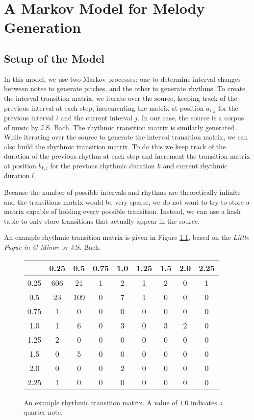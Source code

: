 \chapter{A Markov Model for Melody Generation} \label{markov}

\section{Setup of the Model} \label{markov:setup}

In this model, we use two Markov processes: one to determine interval changes between notes to generate pitches, and the other to generate rhythms.
To create the interval transition matrix, we iterate over the source, keeping track of the previous interval at each step, incrementing the matrix at position $a_{i,j}$ for the previous interval $i$ and the current interval $j$.
In our case, the source is a corpus of music by J.S. Bach.
The rhythmic transition matrix is similarly generated.
While iterating over the source to generate the interval transition matrix, we can also build the rhythmic transition matrix.
To do this we keep track of the duration of the previous rhythm at each step and increment the transition matrix at position $b_{k,l}$ for the previous rhythmic duration $k$ and current rhythmic duration $l$.

Because the number of possible intervals and rhythms are theoretically infinite and the transitions matrix would be very sparse, we do not want to try to store a matrix capable of holding every possible transition.
Instead, we can use a hash table to only store transitions that actually appear in the source.

An example rhythmic transition matrix is given in Figure \ref{fig:rhythmTransitionMatrix}, based on the \textit{Little Fugue in G Minor} by J.S. Bach.

\begin{figure}
	\centering
	\begin{tabular}{c | c c c c c c c c}
		& 0.25 & 0.5 & 0.75 & 1.0 & 1.25 & 1.5 & 2.0 & 2.25\\
		\hline
		0.25 & 606 & 21 & 1 & 2 & 1 & 2 & 0 & 1\\
		0.5 & 23 & 109 & 0 & 7 & 1 & 0 & 0 & 0\\
		0.75 & 1 & 0 & 0 & 0 & 0 & 0 & 0 & 0\\
		1.0 & 1 & 6 & 0 & 3 & 0 & 3 & 2 & 0\\
		1.25 & 2 & 0 & 0 & 0 & 0 & 0 & 0 & 0\\
		1.5 & 0 & 5 & 0 & 0 & 0 & 0 & 0 & 0\\
		2.0 & 0 & 0 & 0 & 2 & 0 & 0 & 0 & 0\\
		2.25 & 1 & 0 & 0 & 0 & 0 & 0 & 0 & 0
	\end{tabular}
	\caption{An example rhythmic transition matrix. A value of $1.0$ indicates a quarter note.}
	\label{fig:rhythmTransitionMatrix}
\end{figure}

